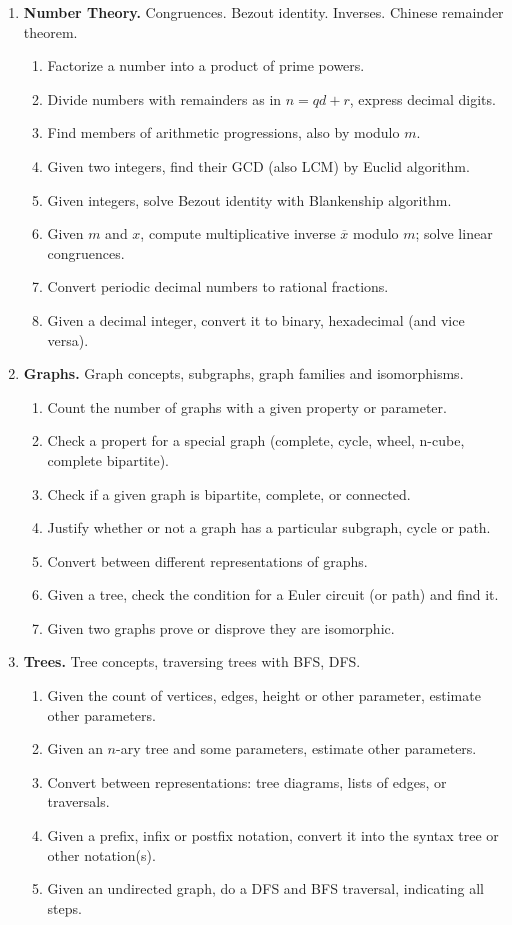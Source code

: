 \documentclass[a4paper,12pt]{article}
\begin{document}
{\small
\begin{enumerate}

\item \textbf{Number Theory.} Congruences. Bezout identity. Inverses. Chinese remainder theorem.
\begin{enumerate}
\item Factorize a number into a product of prime powers.
\item Divide numbers with remainders as in $n = qd + r$, express decimal digits.
\item Find members of arithmetic progressions, also by modulo $m$.
\item Given two integers, find their GCD (also LCM) by Euclid algorithm.
\item Given integers, solve Bezout identity with Blankenship algorithm.
\item Given $m$ and $x$, compute
multiplicative inverse $\overline{x}$ modulo $m$; solve linear congruences.
\item Convert periodic decimal numbers to rational fractions.
\item Given a decimal integer, convert it to binary, hexadecimal (and vice versa).
\end{enumerate}

\item \textbf{Graphs.} Graph concepts, subgraphs, graph families and isomorphisms.
\begin{enumerate}
\item Count the number of graphs with a given property or parameter.
\item Check a propert for a special graph (complete, cycle, wheel, n-cube, complete bipartite).
\item Check if a given graph is bipartite, complete, or connected.
\item Justify whether or not a graph has a particular subgraph, cycle or path.
\item Convert between different representations of graphs.
\item Given a tree, check the condition for a Euler circuit (or path) and find it.
\item Given two graphs prove or disprove they are isomorphic.
\end{enumerate}

\item \textbf{Trees.} Tree concepts, traversing trees with BFS, DFS.
\begin{enumerate}
\item Given the count of vertices, edges, height or other parameter, estimate other parameters.
\item Given an $n$-ary tree and some parameters, estimate other parameters.
\item Convert between representations: tree diagrams, lists of edges, or traversals.
\item Given a prefix, infix or postfix notation, convert it into the syntax tree or other notation(s).
\item Given an undirected graph, do a DFS and BFS traversal, indicating all steps.
\end{enumerate}
\end{enumerate}
}
\end{document}
